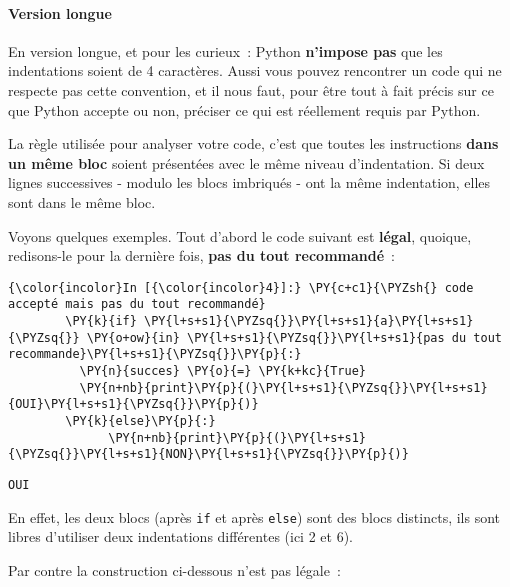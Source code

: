     \hypertarget{version-longue}{%
\paragraph{Version longue}\label{version-longue}}

    En version longue, et pour les curieux~: Python \textbf{n'impose pas}
que les indentations soient de 4 caractères. Aussi vous pouvez
rencontrer un code qui ne respecte pas cette convention, et il nous
faut, pour être tout à fait précis sur ce que Python accepte ou non,
préciser ce qui est réellement requis par Python.

    La règle utilisée pour analyser votre code, c'est que toutes les
instructions \textbf{dans un même bloc} soient présentées avec le même
niveau d'indentation. Si deux lignes successives - modulo les blocs
imbriqués - ont la même indentation, elles sont dans le même bloc.

Voyons quelques exemples. Tout d'abord le code suivant est
\textbf{légal}, quoique, redisons-le pour la dernière fois, \textbf{pas
du tout recommandé}~:

    \begin{Verbatim}[commandchars=\\\{\},frame=single,framerule=0.3mm,rulecolor=\color{cellframecolor}]
{\color{incolor}In [{\color{incolor}4}]:} \PY{c+c1}{\PYZsh{} code accepté mais pas du tout recommandé}
        \PY{k}{if} \PY{l+s+s1}{\PYZsq{}}\PY{l+s+s1}{a}\PY{l+s+s1}{\PYZsq{}} \PY{o+ow}{in} \PY{l+s+s1}{\PYZsq{}}\PY{l+s+s1}{pas du tout recommande}\PY{l+s+s1}{\PYZsq{}}\PY{p}{:}
          \PY{n}{succes} \PY{o}{=} \PY{k+kc}{True}
          \PY{n+nb}{print}\PY{p}{(}\PY{l+s+s1}{\PYZsq{}}\PY{l+s+s1}{OUI}\PY{l+s+s1}{\PYZsq{}}\PY{p}{)}
        \PY{k}{else}\PY{p}{:}
              \PY{n+nb}{print}\PY{p}{(}\PY{l+s+s1}{\PYZsq{}}\PY{l+s+s1}{NON}\PY{l+s+s1}{\PYZsq{}}\PY{p}{)}
\end{Verbatim}


    \begin{Verbatim}[commandchars=\\\{\},frame=single,framerule=0.3mm,rulecolor=\color{cellframecolor}]
OUI
\end{Verbatim}

    En effet, les deux blocs (après \texttt{if} et après \texttt{else}) sont
des blocs distincts, ils sont libres d'utiliser deux indentations
différentes (ici 2 et 6).

    Par contre la construction ci-dessous n'est pas légale~:

